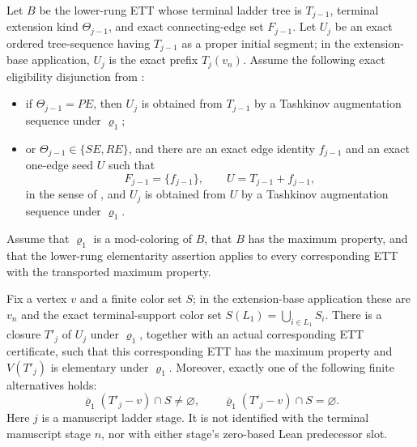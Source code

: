 \begin{lemma}
Let \(B\) be the lower-rung ETT whose terminal ladder tree is
\(T_{j-1}\), terminal extension kind \(\Theta_{j-1}\), and exact
connecting-edge set \(F_{j-1}\).  Let \(U_j\) be an exact ordered
tree-sequence having \(T_{j-1}\) as a proper initial segment; in the
extension-base application, \(U_j\) is the exact prefix \(T_j(v_n)\).
Assume the
following exact eligibility disjunction from :
\begin{itemize}
\item if \(\Theta_{j-1}=PE\), then \(U_j\) is obtained from
  \(T_{j-1}\) by a Tashkinov augmentation sequence under \(\varrho_1\);
\item or \(\Theta_{j-1}\in\{SE,RE\}\), and there are an exact edge
  identity \(f_{j-1}\) and an exact one-edge seed \(U\) such that
  \[
    F_{j-1}=\{f_{j-1}\},\qquad
    U=T_{j-1}+f_{j-1},
  \]
  in the sense of , and \(U_j\)
  is obtained from \(U\) by a Tashkinov augmentation sequence under
  \(\varrho_1\).
\end{itemize}
Assume that \(\varrho_1\) is a mod-coloring of \(B\), that \(B\) has
the maximum property, and that the lower-rung elementarity assertion
applies to every corresponding ETT with the transported maximum property.

Fix a vertex \(v\) and a finite color set \(S\); in the extension-base
application these are \(v_n\) and
the exact terminal-support color set
\(S(L_1)=\bigcup_{i\in L_1}S_i\).  There is a closure \(T'_j\) of
\(U_j\) under \(\varrho_1\), together with an actual corresponding
ETT certificate, such that this corresponding ETT has the maximum
property and \(V(T'_j)\) is elementary under \(\varrho_1\).  Moreover,
exactly one of the following finite alternatives holds:
\[
\overline\varrho_1(T'_j-v)\cap S\ne\varnothing,
 \qquad
 \overline\varrho_1(T'_j-v)\cap S=\varnothing.                \tag{12}
\]
Here \(j\) is a manuscript ladder stage.  It is not identified with the
terminal manuscript stage \(n\), nor with either stage's zero-based Lean
predecessor slot.
\end{lemma}
